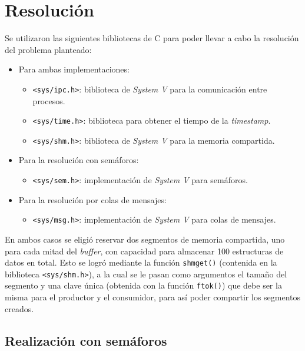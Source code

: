 \section{Resolución}

Se utilizaron las siguientes bibliotecas de C para poder llevar a cabo la resolución del problema planteado:
\begin{itemize}
    \item Para ambas implementaciones:
    \begin{itemize}
        \item \texttt{<sys/ipc.h>}: biblioteca de \textit{System V} para la comunicación entre procesos.
        \item \texttt{<sys/time.h>}: biblioteca para obtener el tiempo de la \textit{timestamp}.
        \item \texttt{<sys/shm.h>}: biblioteca de \textit{System V} para la memoria compartida.
    \end{itemize}
    \item Para la resolución con semáforos:
    \begin{itemize}
        \item \texttt{<sys/sem.h>}: implementación de \textit{System V} para semáforos.
    \end{itemize}
    \item Para la resolución por colas de mensajes:
    \begin{itemize}
        \item \texttt{<sys/msg.h>}: implementación de \textit{System V} para colas de mensajes.\\
    \end{itemize}
\end{itemize}

En ambos casos se eligió reservar dos segmentos de memoria compartida, uno para cada mitad del \textit{buffer}, con capacidad para almacenar 100 estructuras de datos en total. Esto se logró mediante la función \texttt{shmget()} (contenida en la biblioteca \texttt{<sys/shm.h>}), a la cual se le pasan como argumentos el tamaño del segmento y una clave única (obtenida con la función \texttt{ftok()}) que debe ser la misma para el productor y el consumidor, para así poder compartir los segmentos creados.\\

\subsection{Realización con semáforos}

